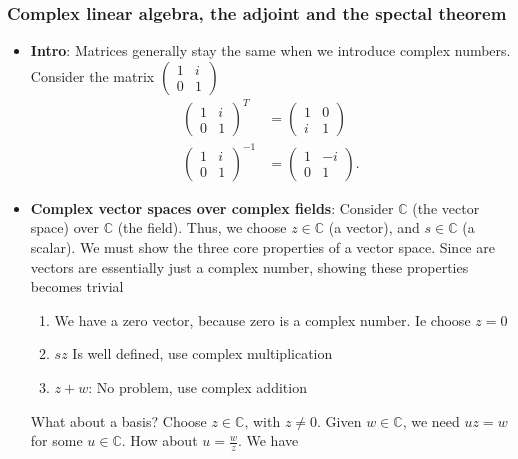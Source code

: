 \documentclass{report}
\begin{document}
    \pagebreak 
    \subsubsection{Complex linear algebra, the adjoint and the spectal theorem}
    \begin{itemize}
        \item \textbf{Intro}: Matrices generally stay the same when we introduce complex numbers. Consider the matrix $\begin{pmatrix} 1 & i \\ 0 & 1\end{pmatrix}$
            \begin{align*}
                \begin{pmatrix} 1 & i \\ 0 & 1\end{pmatrix}^{T} &= \begin{pmatrix} 1 & 0 \\ i & 1 \end{pmatrix} \\
                \begin{pmatrix} 1 & i \\ 0 & 1\end{pmatrix}^{-1} &= \begin{pmatrix} 1 & -i \\ 0 & 1\end{pmatrix}
            .\end{align*}
        \item \textbf{Complex vector spaces over complex fields}: Consider $\mathbb{C}$ (the vector space) over $\mathbb{C}$ (the field). Thus, we choose $z \in \mathbb{C}$ (a vector), and $s \in \mathbb{C}$ (a scalar). We must show the three core properties of a vector space. Since are vectors are essentially just a complex number, showing these properties becomes trivial
            \begin{enumerate}
                \item We have a zero vector, because zero is a complex number. Ie choose $z=0$
                \item $sz$ Is well defined, use complex multiplication
                \item $z+w$: No problem, use complex addition
            \end{enumerate}
            What about a basis? Choose $z \in \mathbb{C}$, with $z\ne 0$. Given $w\in \mathbb{C}$, we need $uz = w$ for some $u \in \mathbb{C}$. How about $u = \frac{w}{z}$. We have

\end{itemize}
\end{document}
